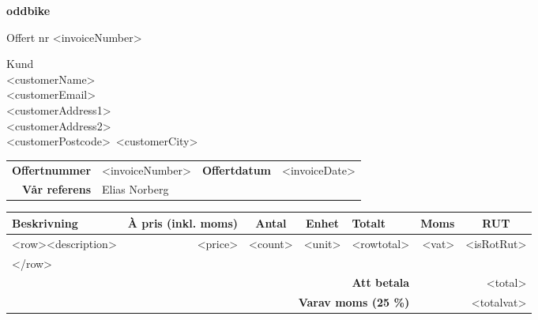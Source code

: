 \documentclass[a4paper,11pt]{extarticle}
\newcommand{\changefont}{%
        \fontsize{9}{11}\selectfont
    }
\begin{document}
\pagestyle{fancy}
\fancyhf{} %
\renewcommand{\headrulewidth}{0pt}
\renewcommand{\footrulewidth}{0pt}

\setlength{\fboxsep}{1.5em}
\setlength{\parindent}{0pt}

{\color{OliveGreen}
\fontsize{48}{0}\selectfont
\hspace{-0.6em}
\textbf{
oddbike}}

\vspace{2em}
\begin{minipage}[t]{0.45\textwidth}
{\huge
Offert nr <invoiceNumber> \\
}
    \vspace{2em}
\end{minipage}
\begin{minipage}[t]{0.3\textwidth}
{\huge Kund}\\

<customerName>\\
<customerEmail>\\
<customerAddress1>\\
<customerAddress2>\\
<customerPostcode>~<customerCity>\\
\end{minipage}

\renewcommand\arraystretch{1.5}
\begin{tabular*}{\linewidth}{rlrl}
\hline
    \textbf{Offertnummer} & <invoiceNumber> & \textbf{Offertdatum} & <invoiceDate> \\
    \textbf{Vår referens} & Elias Norberg & &\\
\hline
\end{tabular*}

\begin{tabularx}{\textwidth}{Xrrrrrc}
\rowcolor{Gray}
\changefont \textbf{Beskrivning} &
\multicolumn{1}{l}{\changefont \textbf{À pris (inkl. moms)}} &
\multicolumn{1}{c}{\changefont \textbf{Antal}} &
\multicolumn{1}{c}{\changefont \textbf{Enhet}} &
\multicolumn{1}{l}{\changefont \textbf{Totalt}} &
\multicolumn{1}{c}{\changefont \textbf{Moms}} &
\changefont \textbf{RUT}\\
\hline
    <row><description> & <price> & <count> & <unit> & <rowtotal> & <vat> & <isRotRut>\\
    </row>
    & & & & & & \\
\hline
    \multicolumn{5}{r}{\textbf{Att betala}} & \multicolumn{2}{r}{<total>} \\
    \multicolumn{5}{r}{\textbf{Varav moms (25 \%)}} & \multicolumn{2}{r}{<totalvat>} \\
\hline
\end{tabularx}
\end{document}
